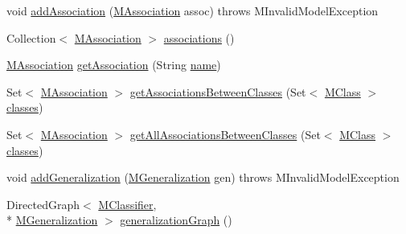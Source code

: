\begin{DoxyCompactItemize}
\item 
void \hyperlink{classorg_1_1tzi_1_1use_1_1uml_1_1mm_1_1_m_model_a8edbbb3d84dc746731b00acd5e93dff6}{add\-Association} (\hyperlink{interfaceorg_1_1tzi_1_1use_1_1uml_1_1mm_1_1_m_association}{M\-Association} assoc)  throws M\-Invalid\-Model\-Exception 
\item 
Collection$<$ \hyperlink{interfaceorg_1_1tzi_1_1use_1_1uml_1_1mm_1_1_m_association}{M\-Association} $>$ \hyperlink{classorg_1_1tzi_1_1use_1_1uml_1_1mm_1_1_m_model_a356173e5bb56ece0b62560817766b6b3}{associations} ()
\item 
\hyperlink{interfaceorg_1_1tzi_1_1use_1_1uml_1_1mm_1_1_m_association}{M\-Association} \hyperlink{classorg_1_1tzi_1_1use_1_1uml_1_1mm_1_1_m_model_a4190536a9627c0bfc77062744e50d545}{get\-Association} (String \hyperlink{classorg_1_1tzi_1_1use_1_1uml_1_1mm_1_1_m_model_element_impl_ac9997b04c10d247c21c22d431d99400d}{name})
\item 
Set$<$ \hyperlink{interfaceorg_1_1tzi_1_1use_1_1uml_1_1mm_1_1_m_association}{M\-Association} $>$ \hyperlink{classorg_1_1tzi_1_1use_1_1uml_1_1mm_1_1_m_model_a1efb26e20eab04fcb6bd5738df167091}{get\-Associations\-Between\-Classes} (Set$<$ \hyperlink{interfaceorg_1_1tzi_1_1use_1_1uml_1_1mm_1_1_m_class}{M\-Class} $>$ \hyperlink{classorg_1_1tzi_1_1use_1_1uml_1_1mm_1_1_m_model_a69fe11e7513a709807c99da655f2e2ee}{classes})
\item 
Set$<$ \hyperlink{interfaceorg_1_1tzi_1_1use_1_1uml_1_1mm_1_1_m_association}{M\-Association} $>$ \hyperlink{classorg_1_1tzi_1_1use_1_1uml_1_1mm_1_1_m_model_a7cb2fec163e081851da7973709ffdb86}{get\-All\-Associations\-Between\-Classes} (Set$<$ \hyperlink{interfaceorg_1_1tzi_1_1use_1_1uml_1_1mm_1_1_m_class}{M\-Class} $>$ \hyperlink{classorg_1_1tzi_1_1use_1_1uml_1_1mm_1_1_m_model_a69fe11e7513a709807c99da655f2e2ee}{classes})
\item 
void \hyperlink{classorg_1_1tzi_1_1use_1_1uml_1_1mm_1_1_m_model_a5f87d4f7bd43efc75020a69b40902100}{add\-Generalization} (\hyperlink{classorg_1_1tzi_1_1use_1_1uml_1_1mm_1_1_m_generalization}{M\-Generalization} gen)  throws M\-Invalid\-Model\-Exception 
\item 
Directed\-Graph$<$ \hyperlink{interfaceorg_1_1tzi_1_1use_1_1uml_1_1mm_1_1_m_classifier}{M\-Classifier}, \\*
\hyperlink{classorg_1_1tzi_1_1use_1_1uml_1_1mm_1_1_m_generalization}{M\-Generalization} $>$ \hyperlink{classorg_1_1tzi_1_1use_1_1uml_1_1mm_1_1_m_model_a4a9b10018bf203ae46cce48211555a67}{generalization\-Graph} ()
\item 

\end{DoxyCompactItemize}
